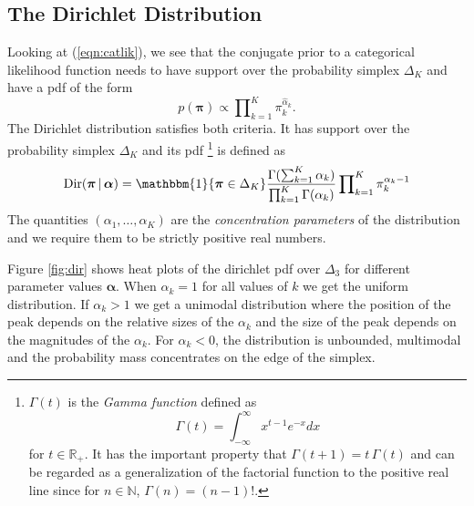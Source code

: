 \documentclass[final,3p,times,twocolumn]{elsarticle}
\DeclareMathOperator*{\Dir}{Dir}
\let\bs\boldsymbol
\begin{document}
\subsection{The Dirichlet Distribution}
\label{sect:dirdistro}
Looking at (\ref{eqn:catlik}), we see that the conjugate prior to a categorical likelihood function needs to have support over the probability simplex $\Delta_K$ and have a pdf of the form 
\begin{equation}
p(\bs \pi) \propto \prod\nolimits_{k=1}^K \pi_k^{\hat\alpha_k}.
\end{equation}
The Dirichlet distribution satisfies both criteria. 
It has support over the probability simplex $\Delta_K$ and its pdf
\footnote{
$\Gamma(t)$ is the \emph{Gamma function} defined as 
\[
\Gamma(t) = \int\nolimits_{-\infty}^{\infty} x^{t-1} e^{-x} dx
\]	
for $t \in \mathbb{R}_+$.
It has the important property that $\Gamma(t+1) = t\,\Gamma(t)$ and can be regarded as a generalization of the factorial function to the positive real line since for $n\in \mathbb{N}$, $\Gamma(n) = (n-1)!$.
}
is defined as
\begin{equation}
\label{eqn:dirpdf}
\Dir(\bs \pi\,|\,\bs \alpha) = \mathbbm{1}\{\bs \pi \in \Delta_K\}\frac{\Gamma(\sum_{k=1}^K\alpha_k)}{\prod_{k=1}^K\Gamma(\alpha_k)}\prod\nolimits_{k=1}^K\pi_k^{\alpha_k - 1} 
\end{equation}
The quantities $(\alpha_1,\dots,\alpha_K)$ are the \emph{concentration parameters} of the distribution and we require them to be strictly positive real numbers. 

Figure \ref{fig:dir} shows heat plots of the dirichlet pdf over $\Delta_3$ for different parameter values $\bs \alpha$.
When $\alpha_k = 1$ for all values of $k$ we get the uniform distribution.
If $\alpha_k  > 1$ we get a unimodal distribution where the position of the peak depends on the relative sizes of the $\alpha_k$ and the size of the peak depends on the magnitudes of the $\alpha_k$.
For $\alpha_k < 0$, the distribution is unbounded, multimodal and the probability mass concentrates on the edge of the simplex.
\end{document}
